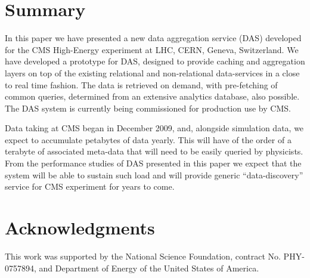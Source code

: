 \documentclass[3p,times]{elsarticle}
\begin{document}
\section{Summary}
In this paper we have presented a new data aggregation service (DAS) 
developed for the CMS High-Energy experiment at LHC, CERN, Geneva, Switzerland. 
We have developed a prototype for DAS, designed to provide 
caching and aggregation layers on top of the existing relational and 
non-relational data-services in a close to real time fashion. The data 
is retrieved on demand, with pre-fetching of common queries, 
determined from an extensive analytics database, also possible. 
The DAS system is currently being commissioned for production use by CMS. 

Data taking at CMS began in December 2009, and, alongside simulation 
data, we expect to accumulate petabytes of data yearly. This will have 
of the order of a terabyte of associated meta-data that will need to be 
easily queried by physicists. From the performance studies of DAS presented 
in this paper we expect that the system will be able to sustain such load 
and will provide generic “data-discovery” service for CMS experiment for 
years to come.

\section{Acknowledgments}

This work was supported by the National Science Foundation, 
contract No. PHY-0757894, and 
Department of Energy of the United States of America. 




%
%



\end{document}
